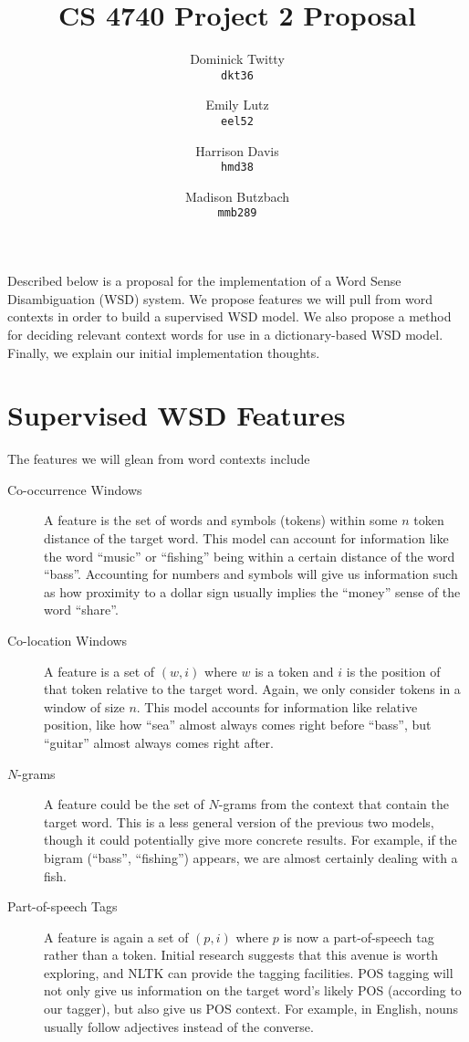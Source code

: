 \documentclass[11pt]{article}
\begin{document}
\title{CS 4740 Project 2 Proposal}
\author{Dominick Twitty \\ \texttt{dkt36}
\and
Emily Lutz \\ \texttt{eel52}
\and
Harrison Davis \\ \texttt{hmd38}
\and
Madison Butzbach \\ \texttt{mmb289}}
\date{}
\maketitle
Described below is a proposal for the implementation of a Word Sense Disambiguation (WSD) system. We propose features we will pull from word contexts in order to build a supervised WSD model. We also propose a method for deciding relevant context words for use in a dictionary-based WSD model. Finally, we explain our initial implementation thoughts.

\section{Supervised WSD Features}
The features we will glean from word contexts include
\begin{description}
\item[Co-occurrence Windows] A feature is the set of words and symbols (tokens) within some $n$ token distance of the target word. This model can account for information like the word ``music'' or ``fishing'' being within a certain distance of the word ``bass''. Accounting for numbers and symbols will give us information such as how proximity to a dollar sign usually implies the ``money'' sense of the word ``share''.
\item[Co-location Windows] A feature is a set of $(w, i)$ where $w$ is a token and $i$ is the position of that token relative to the target word. Again, we only consider tokens in a window of size $n$. This model accounts for information like relative position, like how ``sea'' almost always comes right before ``bass'', but ``guitar'' almost always comes right after.
\item[$N$-grams] A feature could be the set of $N$-grams from the context that contain the target word. This is a less general version of the previous two models, though it could potentially give more concrete results. For example, if the bigram (``bass'', ``fishing'') appears, we are almost certainly dealing with a fish.
\item[Part-of-speech Tags] A feature is again a set of $(p, i)$ where $p$ is now a part-of-speech tag rather than a token. Initial research suggests that this avenue is worth exploring, and NLTK can provide the tagging facilities. POS tagging will not only give us information on the target word's likely POS (according to our tagger), but also give us POS context. For example, in English, nouns usually follow adjectives instead of the converse.
\end{description}
\end{document}
